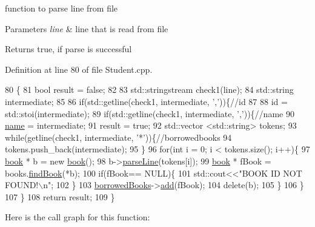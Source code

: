 function to parse line from file 
\begin{DoxyParams}{Parameters}
{\em line} & line that is read from file \\
\hline
\end{DoxyParams}
\begin{DoxyReturn}{Returns}
true, if parse is successful 
\end{DoxyReturn}


Definition at line 80 of file Student.\+cpp.


\begin{DoxyCode}
80                                                             \{
81     \textcolor{keywordtype}{bool} result = \textcolor{keyword}{false};
82 
83     std::stringstream check1(line);
84     std::string intermediate;
85 
86     \textcolor{keywordflow}{if}(std::getline(check1, intermediate, \textcolor{charliteral}{','}))\{\textcolor{comment}{//id}
87 
88         \textcolor{keywordtype}{id} =  std::stoi(intermediate);
89             \textcolor{keywordflow}{if}(std::getline(check1, intermediate, \textcolor{charliteral}{','}))\{\textcolor{comment}{//name}
90             \hyperlink{classstudent_a8bba46a454eaecf8619a68c4c38c7b8d}{name} = intermediate;
91             result = \textcolor{keyword}{true};
92             std::vector <std::string> tokens;
93             \textcolor{keywordflow}{while}(getline(check1, intermediate, \textcolor{charliteral}{'*'}))\{\textcolor{comment}{//borrowedbooks}
94                 tokens.push\_back(intermediate);
95             \}
96             \textcolor{keywordflow}{for}(\textcolor{keywordtype}{int} i = 0; i < tokens.size(); i++)\{
97                 \hyperlink{classbook}{book} * b = \textcolor{keyword}{new} \hyperlink{classbook}{book}();
98                 b->\hyperlink{classbook_acf51be6cb1a1e98d461144e134583c8f}{parseLine}(tokens[i]);
99                 \hyperlink{classbook}{book} * fBook = books.\hyperlink{class_book_handler_aab461b060b38d51586ed043143b4bc68}{findBook}(*b);
100                 \textcolor{keywordflow}{if}(fBook== NULL)\{
101                     std::cout<<\textcolor{stringliteral}{"BOOK ID NOT FOUND!\(\backslash\)n"};
102                 \}
103                 \hyperlink{classstudent_ab477f6c1525709586ea41364dc8c568b}{borrowedBooks}->\hyperlink{classqueue_l_l_adcbcc26433da2c9d17b6cf0802d1d7d2}{add}(fBook);
104                 \textcolor{keyword}{delete}(b);
105             \}
106         \}
107     \}
108     \textcolor{keywordflow}{return} result;
109 \}
\end{DoxyCode}
Here is the call graph for this function\+:
